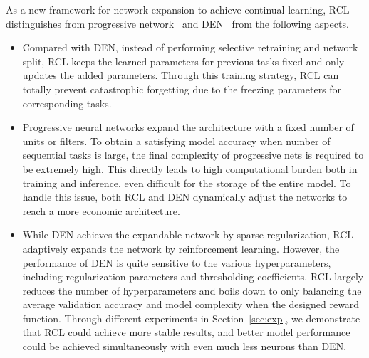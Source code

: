 \documentclass{article}
\begin{document}

As a new framework for network expansion to achieve continual learning, RCL distinguishes from progressive network~\cite{rusu1} and DEN~\cite{yoon1} from the following aspects.
\begin{itemize}
\item Compared with DEN, instead of performing selective retraining and network split,  RCL keeps the learned parameters for previous tasks fixed and only updates the added parameters. Through this training strategy, RCL can totally prevent catastrophic forgetting due to the freezing parameters for corresponding tasks.
\item Progressive neural networks expand the architecture with a fixed number of units or filters. To obtain a satisfying model accuracy when number of sequential tasks is large, the final complexity of progressive nets is required to be extremely high. This directly leads to high computational burden both in training and inference, even difficult for the storage of the entire model. To handle this issue, both RCL and DEN dynamically adjust the networks to reach a more economic architecture.
\item While DEN achieves the expandable network by sparse regularization, RCL adaptively expands the network by reinforcement learning.
However, the performance of DEN is quite sensitive to the various hyperparameters, including regularization parameters and thresholding coefficients. RCL largely reduces the number of hyperparameters and boils down to only balancing the average validation accuracy and model complexity when the designed reward function.  Through different experiments in Section~\ref{sec:exp}, we demonstrate that RCL could achieve more stable results, and better model performance could be achieved simultaneously with even much less neurons than DEN.
\end{itemize}
\end{document}
